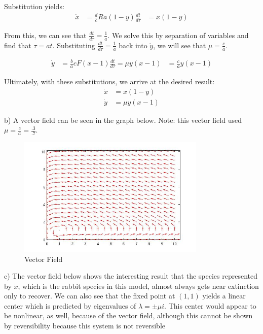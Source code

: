 \documentclass[12pt]{article}
\newenvironment{myenv}{\begin{adjustwidth}{1cm}{}}{\end{adjustwidth}}
\begin{document}
\begin{myenv}
Substitution yields:
\begin{alignat*}{3}
\dot{x} &= \frac{d}{c}Ra(1-y)\frac{dt}{d\tau} &= x(1-y)
\end{alignat*}

From this, we can see that $\frac{dt}{d\tau} = \frac{1}{a}$. We solve this by separation of variables and find that $\tau = at$. Substituting $\frac{dt}{d\tau} = \frac{1}{a}$ back into $\dot{y}$, we will see that $\mu = \frac{c}{a}$.

\begin{align*}
\dot{y} &= \frac{b}{a}cF(x-1)\frac{dt}{d\tau} = \mu y(x-1) &= \frac{c}{a}y(x-1)
\end{align*}

Ultimately, with these substitutions, we arrive at the desired result:
\begin{alignat*}{3}
\dot{x} &= x(1-y) \\
\dot{y} &= \mu y(x-1)
\end{alignat*}

b) A vector field can be seen in the graph below. Note: this vector field used $\mu = \frac{c}{a} = \frac{.3}{.7}$.
\begin{figure} [H]
    \centering
    \includegraphics[width=0.8\textwidth]{Question5_VectorField}
    \caption{ Vector Field}
    \label{figure:a0}
\end{figure}

c) The vector field below shows the interesting result that the species represented by $\dot{x}$, which is the rabbit species in this model, almost always gets near extinction only to recover. We can also see that the fixed point at $(1,1)$ yields a linear center which is predicted by eigenvalues of $\lambda = \pm \mu i$. This center would appear to be nonlinear, as well, because of the vector field, although this cannot be shown by reversibility because this system is not reversible

\end{myenv}
\end{document}
